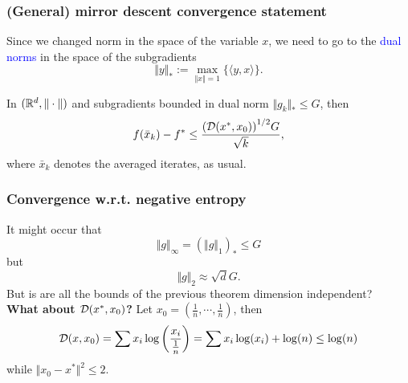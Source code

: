 \documentclass{beamer}
\begin{document}



\begin{frame}
  \frametitle{(General) mirror descent convergence statement}
  Since we changed norm in the space of the variable $x$, we need to go to the \textcolor{blue}{dual norms} in the space of the subgradients
  \begin{equation}
    \Vert y \Vert_* := \max_{\Vert x \Vert=1} \{ \langle y, x \rangle\}.
  \end{equation}
  \begin{theorem}
    In $(\mathbb{R}^d, \Vert \cdot \Vert)$ and subgradients bounded in dual norm $\Vert g_k \Vert_* \le G$, then
    \begin{equation}
      f(\bar{x}_k) - f^* \le \frac{{(\mathcal{D}(x^*, x_0))}^{1/2} G}{\sqrt{k}},
    \end{equation}
    where $\bar{x}_k$ denotes the averaged iterates, as usual.
  \end{theorem}
\end{frame}


\begin{frame}
  \frametitle{Convergence w.r.t. negative entropy}
    It might occur that
    \begin{equation}
      \Vert g \Vert_\infty = (\Vert g \Vert_1)_* \le G
    \end{equation}
    but
    \begin{equation}
      \Vert g \Vert_2 \approx \sqrt{d} G.
    \end{equation}
    But is are all the bounds of the previous theorem dimension independent?\\
    \textbf{What about $\mathcal{D}(x^*, x_0) $?}
    Let $x_0 = (\frac{1}{n}, \cdots , \frac{1}{n})$, then
    \begin{equation}
      \mathcal{D}(x, x_0) = \sum x_i \log\left(\frac{x_i}{\frac1n}\right) = \sum x_i \log(x_i) + \log(n) \le \log(n)
    \end{equation}
    while $ \Vert x_0 - x^* \Vert^2 \le 2$.

\end{frame}
\end{document}
